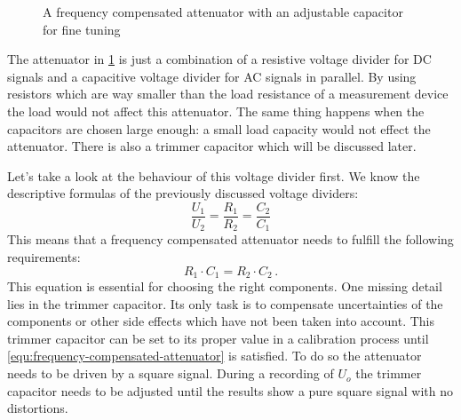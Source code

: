 \begin{figure}[htb]
	\centering
	\caption{A frequency compensated attenuator with an adjustable capacitor for fine tuning}
	\label{fig:frequency-compensated-attenuator}
\end{figure}

The attenuator in \cref{fig:frequency-compensated-attenuator} is just a combination of a resistive voltage divider for DC signals and a capacitive voltage divider for AC signals in parallel. By using resistors which are way smaller than the load resistance of a measurement device the load would not affect this attenuator. The same thing happens when the capacitors are chosen large enough: a small load capacity would not effect the attenuator. There is also a trimmer capacitor which will be discussed later.

Let's take a look at the behaviour of this voltage divider first. We know the descriptive formulas of the previously discussed voltage dividers:
\begin{equation*}
	\frac{U_1}{U_2} = \frac{R_1}{R_2} = \frac{C_2}{C_1}
\end{equation*}
This means that a frequency compensated attenuator needs to fulfill the following requirements:
\begin{equation}
	R_1 \cdot C_1 = R_2 \cdot C_2\,.
	\label{equ:frequency-compensated-attenuator}
\end{equation}
This equation is essential for choosing the right components. One missing detail lies in the trimmer capacitor. Its only task is to compensate uncertainties of the components or other side effects which have not been taken into account. This trimmer capacitor can be set to its proper value in a calibration process until \cref{equ:frequency-compensated-attenuator} is satisfied. To do so the attenuator needs to be driven by a square signal. During a recording of $U_o$ the trimmer capacitor needs to be adjusted until the results show a pure square signal with no distortions.


